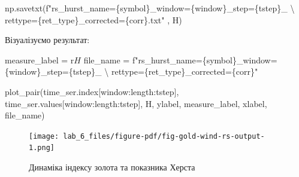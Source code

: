 \documentclass[
  letterpaper,
]{report}
\newenvironment{Shaded}{\begin{snugshade}}{\end{snugshade}}
\newcommand{\CharTok}[1]{\textcolor[rgb]{0.13,0.47,0.30}{#1}}
\newcommand{\NormalTok}[1]{\textcolor[rgb]{0.00,0.23,0.31}{#1}}
\newcommand{\OperatorTok}[1]{\textcolor[rgb]{0.37,0.37,0.37}{#1}}
\newcommand{\SpecialCharTok}[1]{\textcolor[rgb]{0.37,0.37,0.37}{#1}}
\newcommand{\SpecialStringTok}[1]{\textcolor[rgb]{0.13,0.47,0.30}{#1}}
\newcommand{\VerbatimStringTok}[1]{\textcolor[rgb]{0.13,0.47,0.30}{#1}}
\begin{document}
\begin{Shaded}
\begin{Highlighting}[]
\NormalTok{np.savetxt(}\SpecialStringTok{f"rs\_hurst\_name=}\SpecialCharTok{\{}\NormalTok{symbol}\SpecialCharTok{\}}\SpecialStringTok{\_window=}\SpecialCharTok{\{}\NormalTok{window}\SpecialCharTok{\}}\SpecialStringTok{\_step=}\SpecialCharTok{\{}\NormalTok{tstep}\SpecialCharTok{\}}\SpecialStringTok{\_ }\CharTok{\textbackslash{}}
\SpecialStringTok{           rettype=}\SpecialCharTok{\{}\NormalTok{ret\_type}\SpecialCharTok{\}}\SpecialStringTok{\_corrected=}\SpecialCharTok{\{}\NormalTok{corr}\SpecialCharTok{\}}\SpecialStringTok{.txt"}\NormalTok{ , H)}
\end{Highlighting}
\end{Shaded}

Візуалізуємо результат:

\begin{Shaded}
\begin{Highlighting}[]
\NormalTok{measure\_label }\OperatorTok{=} \VerbatimStringTok{r\textquotesingle{}$H$\textquotesingle{}}
\NormalTok{file\_name }\OperatorTok{=} \SpecialStringTok{f"rs\_hurst\_name=}\SpecialCharTok{\{}\NormalTok{symbol}\SpecialCharTok{\}}\SpecialStringTok{\_window=}\SpecialCharTok{\{}\NormalTok{window}\SpecialCharTok{\}}\SpecialStringTok{\_step=}\SpecialCharTok{\{}\NormalTok{tstep}\SpecialCharTok{\}}\SpecialStringTok{\_ }\CharTok{\textbackslash{}}
\SpecialStringTok{           rettype=}\SpecialCharTok{\{}\NormalTok{ret\_type}\SpecialCharTok{\}}\SpecialStringTok{\_corrected=}\SpecialCharTok{\{}\NormalTok{corr}\SpecialCharTok{\}}\SpecialStringTok{"}
\end{Highlighting}
\end{Shaded}

\begin{Shaded}
\begin{Highlighting}[]
\NormalTok{plot\_pair(time\_ser.index[window:length:tstep],}
\NormalTok{          time\_ser.values[window:length:tstep],}
\NormalTok{          H, }
\NormalTok{          ylabel, }
\NormalTok{          measure\_label,}
\NormalTok{          xlabel,}
\NormalTok{          file\_name)}
\end{Highlighting}
\end{Shaded}

\begin{figure}[H]

{\centering \texttt{[image: lab\_6\_files/figure-pdf/fig-gold-wind-rs-output-1.png]}

}

\caption{\label{fig-gold-wind-rs}Динаміка індексу золота та показника
Херста}

\end{figure}
\end{document}
